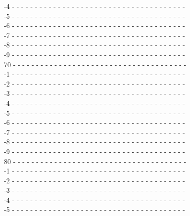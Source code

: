 {\begin{flushleft}
-4 - - - - - - - - - - - - - - - - - - - - - - - - - - - - - - - - - - - - - -\\
-5 - - - - - - - - - - - - - - - - - - - - - - - - - - - - - - - - - - - - - -\\
-6 - - - - - - - - - - - - - - - - - - - - - - - - - - - - - - - - - - - - - -\\
-7 - - - - - - - - - - - - - - - - - - - - - - - - - - - - - - - - - - - - - -\\
-8 - - - - - - - - - - - - - - - - - - - - - - - - - - - - - - - - - - - - - -\\
-9 - - - - - - - - - - - - - - - - - - - - - - - - - - - - - - - - - - - - - -\\
70 - - - - - - - - - - - - - - - - - - - - - - - - - - - - - - - - - - - - - -\\
-1 - - - - - - - - - - - - - - - - - - - - - - - - - - - - - - - - - - - - - -\\
-2 - - - - - - - - - - - - - - - - - - - - - - - - - - - - - - - - - - - - - -\\
-3 - - - - - - - - - - - - - - - - - - - - - - - - - - - - - - - - - - - - - -\\
-4 - - - - - - - - - - - - - - - - - - - - - - - - - - - - - - - - - - - - - -\\
-5 - - - - - - - - - - - - - - - - - - - - - - - - - - - - - - - - - - - - - -\\
-6 - - - - - - - - - - - - - - - - - - - - - - - - - - - - - - - - - - - - - -\\
-7 - - - - - - - - - - - - - - - - - - - - - - - - - - - - - - - - - - - - - -\\
-8 - - - - - - - - - - - - - - - - - - - - - - - - - - - - - - - - - - - - - -\\
-9 - - - - - - - - - - - - - - - - - - - - - - - - - - - - - - - - - - - - - -\\
80 - - - - - - - - - - - - - - - - - - - - - - - - - - - - - - - - - - - - - -\\
-1 - - - - - - - - - - - - - - - - - - - - - - - - - - - - - - - - - - - - - -\\
-2 - - - - - - - - - - - - - - - - - - - - - - - - - - - - - - - - - - - - - -\\
-3 - - - - - - - - - - - - - - - - - - - - - - - - - - - - - - - - - - - - - -\\
-4 - - - - - - - - - - - - - - - - - - - - - - - - - - - - - - - - - - - - - -\\
-5 - - - - - - - - - - - - - - - - - - - - - - - - - - - - - - - - - - - - - -\\

\end{flushleft}}
